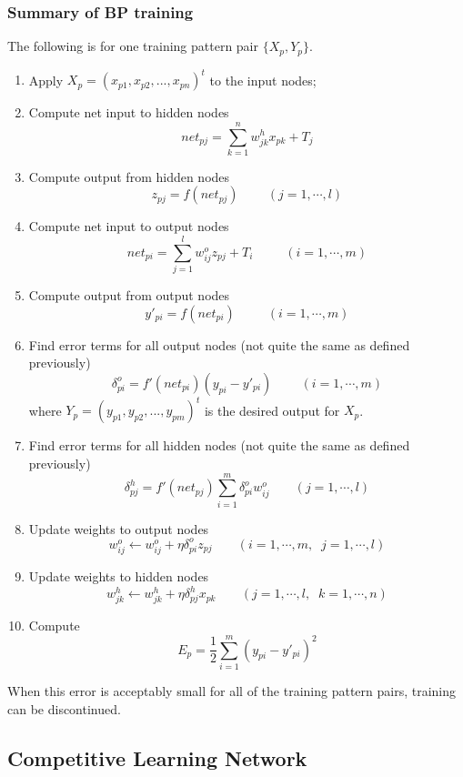 \newpage
\subsubsection*{Summary of BP training}

The following is for one training pattern pair $\{X_p, Y_p\}$.

\begin{enumerate}
\item Apply $X_p=(x_{p1}, x_{p2}, ... , x_{pn})^t$ to the input nodes;

\item Compute net input to hidden nodes
	\[
	net_{pj}=\sum_{k=1}^{n} w_{jk}^{h} x_{pk}+T_j
	\]
\item Compute output from hidden nodes
	\[
	z_{pj}=f(net_{pj})\;\;\;\;\;\;\;\;(j=1,\cdots,l)
	\]
\item Compute net input to output nodes
	\[
	net_{pi}=\sum_{j=1}^{l} w_{ij}^{o} z_{pj} + T_i\;\;\;\;\;\;\;\;\;(i=1,\cdots,m)
	\]
\item Compute output from output nodes
	\[
	y'_{pi}=f(net_{pi})\;\;\;\;\;\;\;\;\;(i=1,\cdots,m)
	\]
\item Find error terms for all output nodes (not quite the same as defined
	previously)
	\[
	\delta_{pi}^{o}=f'(net_{pi}) (y_{pi}-y'_{pi})  \;\;\;\;\;\;\;\;(i=1,\cdots,m)
	\]
	where $Y_p=(y_{p1},y_{p2},...,y_{pm})^t$ is the desired output for
	$X_p$.
\item Find error terms for all hidden nodes (not quite the same as defined
	previously)
	\[
	\delta_{pj}^{h}=f'(net_{pj}) \sum_{i=1}^{m} \delta_{pi}^{o} w_{ij}^o
	\;\;\;\;\;\;\;(j=1,\cdots,l)
	\]
\item Update weights to output nodes
	\[
	w_{ij}^o \leftarrow w_{ij}^o+\eta \delta_{pi}^o z_{pj}\;\;\;\;\;\;\;(i=1,\cdots,m,\;\;j=1,\cdots,l)
	\]
\item Update weights to hidden nodes
	\[
	w_{jk}^h \leftarrow w_{jk}^h+\eta \delta_{pj}^h x_{pk}\;\;\;\;\;\;\;(j=1,\cdots,l,\;\;k=1,\cdots,n)
	\]
\item Compute 
	\[
	E_p=\frac{1}{2}\sum_{i=1}^{m} (y_{pi}-y'_{pi})^2
	\]
\end{enumerate}
When this error is acceptably small for all of the training pattern pairs,
training can be discontinued.

\newpage
\subsection*{Competitive Learning Network}

